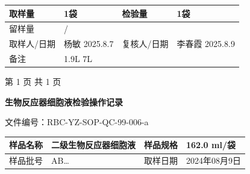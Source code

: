 \documentclass[UTF8,10pt,a4paper,fontset=fandol]{ctexart}
\newcommand{\fieldvalue}[1]{#1}
\newcommand{\handwritten}[1]{#1}
\begin{document}
\begin{tabularx}{\textwidth}{|p{2.0cm}|X|p{2.0cm}|X|}
取样量 &
\fieldvalue{1袋} &
检验量 &
\fieldvalue{1袋}
\\ \hline

留样量 &
\fieldvalue{/} &
\multicolumn{2}{l|}{}
\\ \hline

取样人/日期 &
\multicolumn{1}{l|}{
\fieldvalue{\handwritten{杨敏}}
\quad
\fieldvalue{\handwritten{2025.8.7}}
} &
复核人/日期 &
\multicolumn{1}{l|}{
\fieldvalue{\handwritten{李春霞}}
\quad
\fieldvalue{\handwritten{2025.8.9}}
}
\\ \hline

备注 &
\multicolumn{3}{l|}{
\fieldvalue{\handwritten{1.9L}}
\qquad
\fieldvalue{\handwritten{7L}}
}
\\ \hline
\end{tabularx}

\vfill
\begin{center}
第 1 页 共 1 页
\end{center}

\newpage

\begin{center}
\textbf{生物反应器细胞液检验操作记录}
\end{center}

\noindent
文件编号：RBC-YZ-SOP-QC-99-006-a

\begin{tabularx}{\textwidth}{|l|X|l|X|}
\hline
样品名称 &
\fieldvalue{\handwritten{二级生物反应器细胞液}} &
样品规格 &
\fieldvalue{\handwritten{162.0}} ml/袋
\\
\hline
样品批号 &
\fieldvalue{\handwritten{AB\ldots}} &
取样日期 &
\fieldvalue{\handwritten{2024年08月9日}}
\\
\hline
\end{tabularx}
\end{document}
